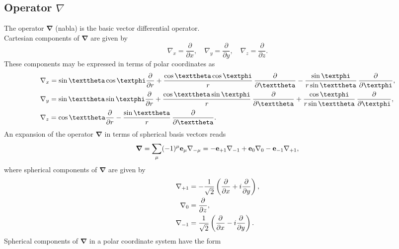 \subsection{Operator $\nabla$}\label{sec:1.3.1}
The operator \(\boldsymbol{\nabla}\) (nabla) is the basic vector differential operator.\\
Cartesian components of \(\boldsymbol{\nabla}\) are given by
\begin{equation}
\nabla_{x}=\frac{\partial}{\partial x}, \quad \nabla_{y}=\frac{\partial}{\partial y}, \quad \nabla_{z}=\frac{\partial}{\partial z} . \label{eq:1:3:1}
\end{equation}
These components may be expressed in terms of polar coordinates as
\begin{align}
& \nabla_{x}=\sin \vartheta \cos \varphi \frac{\partial}{\partial r}+\frac{\cos \vartheta \cos \varphi}{r} \, \frac{\partial}{\partial \vartheta}-\frac{\sin \varphi}{r \sin \vartheta} \, \frac{\partial}{\partial \varphi},  \notag\\
& \nabla_{y}=\sin \vartheta \sin \varphi \frac{\partial}{\partial r}+\frac{\cos \vartheta \sin \varphi}{r} \, \frac{\partial}{\partial \vartheta}+\frac{\cos \varphi}{r \sin \vartheta} \, \frac{\partial}{\partial \varphi},  \label{eq:1:3:2}\\
& \nabla_{z}=\cos \vartheta \frac{\partial}{\partial r}-\frac{\sin \vartheta}{r} \, \frac{\partial}{\partial \vartheta} . \notag
\end{align}
An expansion of the operator $\boldsymbol{\nabla}$ in terms of spherical basis vectors reads
\begin{equation}
\boldsymbol{\nabla}=\sum_{\mu}(-1)^{\mu} \mathbf{e}_{\mu} \nabla_{-\mu}=-\mathbf{e}_{+1} \nabla_{-1}+\mathbf{e}_{0} \nabla_{0}-\mathbf{e}_{-1} \nabla_{+1}, \label{eq:1:3:3}
\end{equation}
where spherical components of \(\boldsymbol{\nabla}\) are given by
\begin{align}
\nabla_{+1} & =-\frac{1}{\sqrt{2}}\left(\frac{\partial}{\partial x}+i \frac{\partial}{\partial y}\right) , \notag\\
\nabla_{0} & =\frac{\partial}{\partial z} , \label{eq:1:3:4}\\
\nabla_{-1} & =\frac{1}{\sqrt{2}}\left(\frac{\partial}{\partial x}-i \frac{\partial}{\partial y}\right) .\notag
\end{align}
Spherical components of \(\boldsymbol{\nabla}\) in a polar coordinate system have the form
